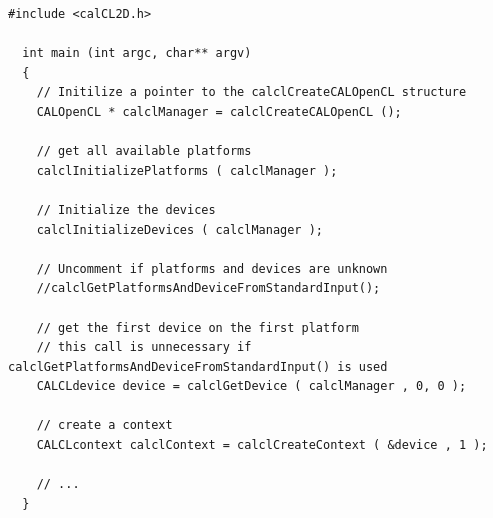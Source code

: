 \begin{lstlisting}[float,floatplacement=H, label=lst:CALOpenCL, caption=Access to platform and devices.]
  #include <calCL2D.h>

  int main (int argc, char** argv)
  {
    // Initilize a pointer to the calclCreateCALOpenCL structure
    CALOpenCL * calclManager = calclCreateCALOpenCL ();

    // get all available platforms
    calclInitializePlatforms ( calclManager );

    // Initialize the devices
    calclInitializeDevices ( calclManager );

    // Uncomment if platforms and devices are unknown
    //calclGetPlatformsAndDeviceFromStandardInput();

    // get the first device on the first platform
    // this call is unnecessary if calclGetPlatformsAndDeviceFromStandardInput() is used
    CALCLdevice device = calclGetDevice ( calclManager , 0, 0 );

    // create a context
    CALCLcontext calclContext = calclCreateContext ( &device , 1 );

    // ...
  }
\end{lstlisting}

